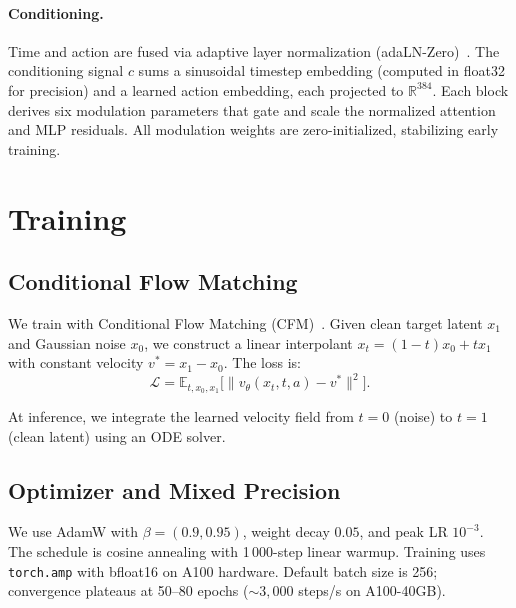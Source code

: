 \documentclass[letterpaper,twocolumn,10pt]{article}
\begin{document}
\paragraph{Conditioning.}
Time and action are fused via adaptive layer normalization
(adaLN-Zero)~\cite{peebles2023dit}.  The conditioning signal $c$ sums a sinusoidal timestep embedding (computed in float32 for precision) and a learned action embedding, each projected to $\mathbb{R}^{384}$. Each block derives six modulation parameters that gate and scale the normalized attention and MLP residuals.  All modulation weights are zero-initialized, stabilizing early training.

\section{Training}

\subsection{Conditional Flow Matching}

We train with Conditional Flow Matching (CFM)~\cite{lipman2023flow}.
Given clean target latent $x_1$ and Gaussian noise $x_0$, we construct
a linear interpolant $x_t = (1-t)x_0 + t x_1$ with constant velocity
$v^* = x_1 - x_0$.  The loss is:
\begin{equation}
  \mathcal{L} = \mathbb{E}_{t,x_0,x_1}
    \bigl[\lVert v_\theta(x_t, t, a) - v^* \rVert^2\bigr].
\end{equation}

At inference, we integrate the learned velocity field from $t=0$ (noise)
to $t=1$ (clean latent) using an ODE solver.

\subsection{Optimizer and Mixed Precision}

We use AdamW with $\beta=(0.9,0.95)$, weight decay $0.05$, and peak LR
$10^{-3}$.  The schedule is cosine annealing with 1\,000-step linear warmup.  Training uses \texttt{torch.amp} with bfloat16 on A100 hardware.
Default batch size is 256; convergence plateaus at 50--80 epochs
(${\sim}3{,}000$ steps/s on A100-40GB).

\end{document}
